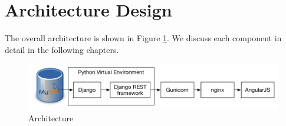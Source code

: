 \section{Architecture Design}
\par The overall architecture is shown in Figure \ref{fig:architecture}. We discuss each component in detail in the following chapters.

\begin{figure}
\centering
\includegraphics[width=\textwidth]{figures/architecture.pdf}
\caption{\label{fig:architecture} Architecture}
\end{figure}





